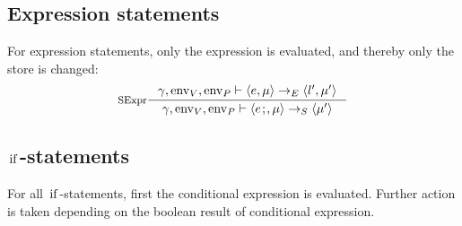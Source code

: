 \documentclass[a4paper, 10pt, draft]{report}
\DeclareMathOperator*{\env}{env}
\newcommand{\mycode}[1]{\ensuremath{\mbox{\lstinline{#1}}}}
\begin{document}
\subsection{Expression statements}\label{sec:semantics:statements:expressions}

For expression statements, only the expression is evaluated, and thereby only the store is changed:
\[\inference[SExpr]{
  \gamma, \env_V, \env_P |- \left<e, \mu \right> \to_E \left<l', \mu' \right>
}{
  \gamma, \env_V, \env_P |- \left<e\mycode{;}, \mu \right> \to_S \left< \mu' \right>
}\]

\subsection{\mycode{if}-statements}\label{sec:semantics:statements:if}

For all \mycode{if}-statements, first the conditional expression is evaluated.
Further action is taken depending on the boolean result of conditional
expression.
\end{document}
